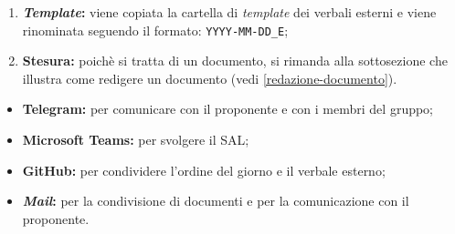 \begin{itemize}
\begin{enumerate}
		      \item \textbf{\textit{Template}:} viene copiata la cartella di \textit{template} dei
		            verbali esterni e viene rinominata seguendo il formato:
		            \texttt{YYYY-MM-DD\_E};

		      \item \textbf{Stesura:} poichè si tratta di un documento, si
		            rimanda alla sottosezione che illustra come redigere un
		            documento (vedi \cref{redazione-documento}).
	      \end{enumerate}
\end{itemize}

\begin{itemize}
	\item \textbf{Telegram\g:} per comunicare con il proponente e con i membri del
	      gruppo;

	\item \textbf{Microsoft Teams:} per svolgere il SAL\g;

	\item \textbf{GitHub\g:} per condividere l'ordine del giorno e il verbale
	      esterno;

	\item \textbf{\textit{Mail}:} per la condivisione di documenti e per la
	      comunicazione con il proponente.
\end{itemize}
